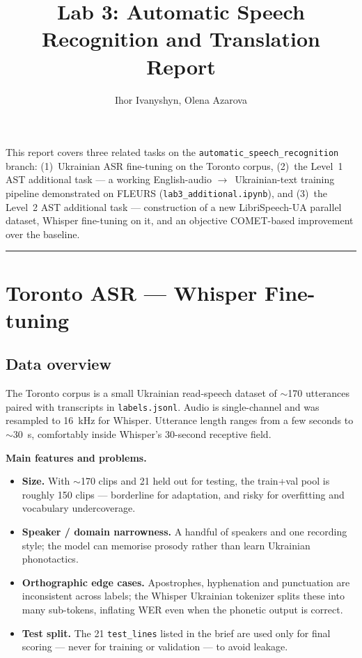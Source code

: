 \documentclass[11pt]{article}
\title{Lab 3: Automatic Speech Recognition and Translation Report}
\author{Ihor Ivanyshyn, Olena Azarova}
\date{}
\newcommand{\sectionrule}{\vspace{0.5em}\noindent\rule{\textwidth}{0.4pt}\vspace{0.5em}}
\begin{document}
\maketitle

\noindent This report covers three related tasks on the
\texttt{automatic\_speech\_recognition} branch:
(1)~Ukrainian ASR fine-tuning on the Toronto corpus,
(2)~the Level~1 AST additional task --- a working English-audio
$\rightarrow$~Ukrainian-text training pipeline demonstrated on FLEURS
(\texttt{lab3\_additional.ipynb}), and
(3)~the Level~2 AST additional task --- construction of a new LibriSpeech-UA
parallel dataset, Whisper fine-tuning on it, and an objective
COMET-based improvement over the baseline.

\sectionrule

\section{Toronto ASR --- Whisper Fine-tuning}

\subsection{Data overview}
The Toronto corpus is a small Ukrainian read-speech dataset of $\sim$170
utterances paired with transcripts in \texttt{labels.jsonl}. Audio is
single-channel and was resampled to 16~kHz for Whisper. Utterance length
ranges from a few seconds to $\sim$30~s, comfortably inside Whisper's
30-second receptive field.

\noindent\textbf{Main features and problems.}
\begin{itemize}
    \item \textbf{Size.} With $\sim$170 clips and 21 held out for testing, the
    train+val pool is roughly 150 clips --- borderline for adaptation, and
    risky for overfitting and vocabulary undercoverage.
    \item \textbf{Speaker / domain narrowness.} A handful of speakers and one
    recording style; the model can memorise prosody rather than learn
    Ukrainian phonotactics.
    \item \textbf{Orthographic edge cases.} Apostrophes, hyphenation and
    punctuation are inconsistent across labels; the Whisper Ukrainian
    tokenizer splits these into many sub-tokens, inflating WER even when the
    phonetic output is correct.
    \item \textbf{Test split.} The 21 \texttt{test\_lines} listed in the brief
    are used only for final scoring --- never for training or validation ---
    to avoid leakage.
\end{itemize}
\end{document}
